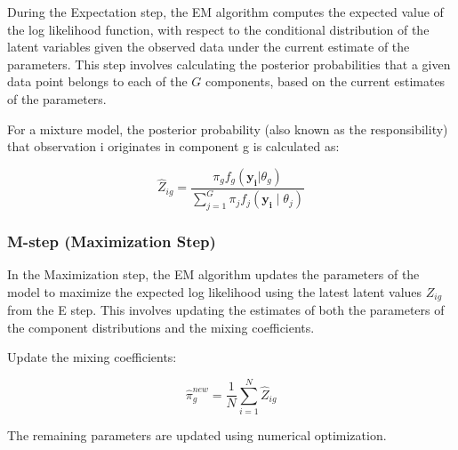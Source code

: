\documentclass{article}
\begin{document}
During the Expectation step, the EM algorithm computes the expected value of the log likelihood function, with respect to the conditional distribution of the latent variables given the observed data under the current estimate of the parameters. This step involves calculating the posterior probabilities that a given data point belongs to each of the $G$ components, based on the current estimates of the parameters.

For a mixture model, the posterior probability (also known as the responsibility) that observation i originates in component g is calculated as:

\begin{equation}
\hat{Z}_{ig} = \frac{\pi_g f_g(\mathbf{y_i}|\theta_g)}{\sum_{j=1}^{G} \pi_j f_j(\mathbf{y_i} \mid \theta_j)}
\end{equation}

\subsubsection{M-step (Maximization Step)}

In the Maximization step, the EM algorithm updates the parameters of the model to maximize the expected log likelihood using the latest latent values $Z_{ig}$ from the E step. 
This involves updating the estimates of both the parameters of the component distributions and the mixing coefficients.

Update the mixing coefficients:

\begin{equation}
\hat{\pi}_g^{new} = \frac{1}{N} \sum_{i=1}^{N} \hat{Z}_{ig}
\end{equation}

The remaining parameters are updated using numerical optimization.



\end{document}
